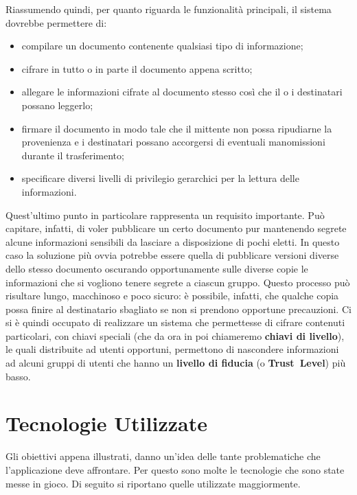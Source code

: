Riassumendo quindi, per quanto riguarda le funzionalità principali, il sistema dovrebbe permettere di:
\begin{itemize}
	\item compilare un documento contenente qualsiasi tipo di informazione;
	\item cifrare in tutto o in parte il documento appena scritto;
	\item allegare le informazioni cifrate al documento stesso così che il o i destinatari possano leggerlo;
	\item firmare il documento in modo tale che il mittente non possa ripudiarne la provenienza e i destinatari possano accorgersi di eventuali manomissioni durante il trasferimento;
	\item specificare diversi livelli di privilegio gerarchici per la lettura delle informazioni.
\end{itemize}
Quest'ultimo punto in particolare rappresenta un requisito importante. Può capitare, infatti, di voler pubblicare un certo documento pur mantenendo segrete alcune informazioni sensibili da lasciare a disposizione di pochi eletti. In questo caso la soluzione più ovvia potrebbe essere quella di pubblicare versioni diverse dello stesso documento oscurando opportunamente sulle diverse copie le informazioni che si vogliono tenere segrete a ciascun gruppo. Questo processo può risultare lungo, macchinoso e poco sicuro: è possibile, infatti, che qualche copia possa finire al destinatario sbagliato se non si prendono opportune precauzioni.
Ci si è quindi occupato di realizzare un sistema che permettesse di cifrare contenuti particolari, con chiavi speciali (che da ora in poi chiameremo \textbf{chiavi di livello}), le quali distribuite ad utenti opportuni, permettono di nascondere informazioni ad alcuni gruppi di utenti che hanno un \textbf{livello di fiducia} (o \textbf{Trust~Level}) più basso.

\section{Tecnologie Utilizzate}
	\label{sec:tecnologie}
Gli obiettivi appena illustrati, danno un'idea delle tante problematiche che l'applicazione deve affrontare. Per questo sono molte le tecnologie che sono state messe in gioco. Di seguito si riportano quelle utilizzate maggiormente.


